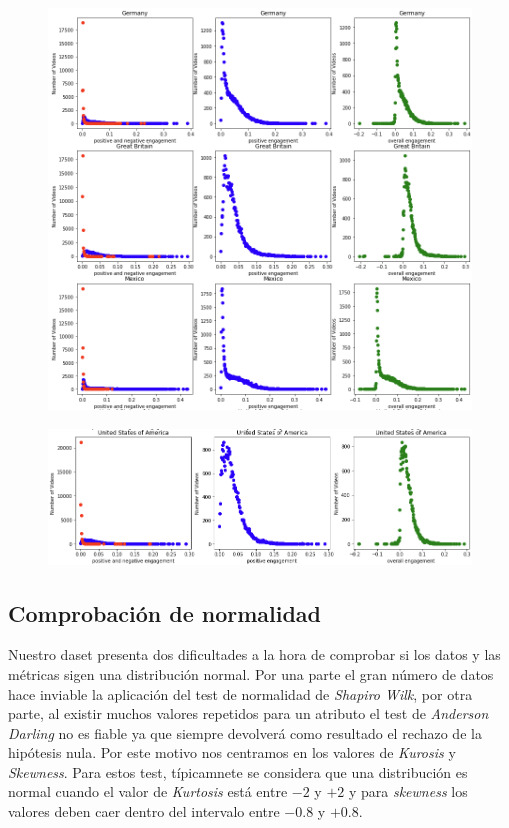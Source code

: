 \documentclass[a4paper,12pt]{article}
\begin{document}
\begin{figure}[h!]
\centering
\includegraphics[width=13cm]{engagement_1.png}
\end{figure}

\begin{figure}[h!]
\centering
\includegraphics[width=13cm]{engagement_2.png}
\end{figure}

\subsection{Comprobaci\'on de normalidad}

Nuestro daset presenta dos dificultades a la hora de comprobar si los datos y las m\'etricas sigen una distribuci\'on normal. Por una parte el gran n\'umero de datos hace inviable la aplicaci\'on del test de normalidad de {\itshape  Shapiro Wilk}, por otra parte, al existir muchos valores repetidos para un atributo el test de {\itshape Anderson Darling} no es fiable ya que siempre devolver\'a como resultado el rechazo de la hip\'otesis nula. Por este motivo nos centramos en los valores de {\itshape Kurosis} y {\itshape Skewness}. Para estos test, t\'ipicamnete se considera que una distribuci\'on es normal cuando el valor de {\itshape Kurtosis} est\'a entre $-2$ y $+2$ y para {\itshape skewness} los valores deben caer dentro del intervalo entre $-0.8$ y $+0.8$.
\end{document}
